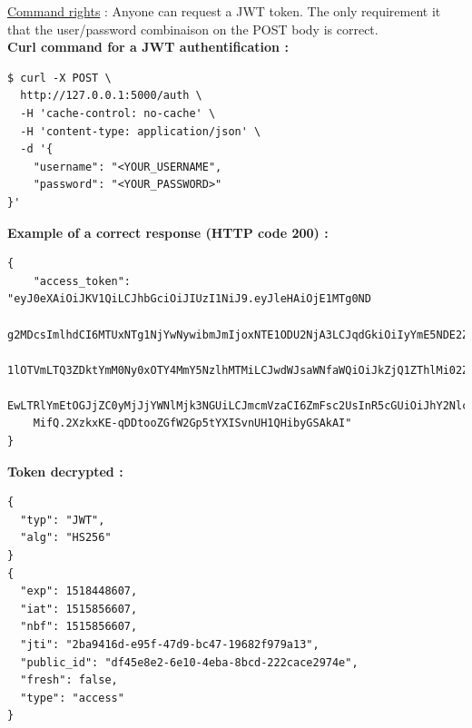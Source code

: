 \underline{Command rights} : Anyone can request a JWT token. The only requirement it that the user/password combinaison on the POST body is correct.\\

\textbf{Curl command for a JWT authentification :}

\begin{tcolorbox}[top=-3mm, bottom=-3mm, left=0mm, right=0mm, enhanced, breakable, colback=LightGray, colframe=DarkGray, colbacktitle=DarkGray]
\begin{verbatim}
$ curl -X POST \
  http://127.0.0.1:5000/auth \
  -H 'cache-control: no-cache' \
  -H 'content-type: application/json' \
  -d '{
    "username": "<YOUR_USERNAME",
    "password": "<YOUR_PASSWORD>"
}'
\end{verbatim}
\end{tcolorbox}

\textbf{Example of a correct response (HTTP code 200) :}

\begin{tcolorbox}[top=-3mm, bottom=-3mm, left=0mm, right=0mm, enhanced, breakable, colback=LightGray, colframe=DarkGray, colbacktitle=DarkGray]
\begin{verbatim}
{
    "access_token": "eyJ0eXAiOiJKV1QiLCJhbGciOiJIUzI1NiJ9.eyJleHAiOjE1MTg0ND
    g2MDcsImlhdCI6MTUxNTg1NjYwNywibmJmIjoxNTE1ODU2NjA3LCJqdGkiOiIyYmE5NDE2ZC
    1lOTVmLTQ3ZDktYmM0Ny0xOTY4MmY5NzlhMTMiLCJwdWJsaWNfaWQiOiJkZjQ1ZThlMi02ZT
    EwLTRlYmEtOGJjZC0yMjJjYWNlMjk3NGUiLCJmcmVzaCI6ZmFsc2UsInR5cGUiOiJhY2Nlc3
    MifQ.2XzkxKE-qDDtooZGfW2Gp5tYXISvnUH1QHibyGSAkAI"
}
\end{verbatim}
\end{tcolorbox}

\textbf{Token decrypted :} 

\begin{tcolorbox}[top=-3mm, bottom=-3mm, left=0mm, right=0mm, enhanced, breakable, colback=LightGray, colframe=DarkGray, colbacktitle=DarkGray]
\begin{verbatim}
{
  "typ": "JWT",
  "alg": "HS256"
}
{
  "exp": 1518448607,
  "iat": 1515856607,
  "nbf": 1515856607,
  "jti": "2ba9416d-e95f-47d9-bc47-19682f979a13",
  "public_id": "df45e8e2-6e10-4eba-8bcd-222cace2974e",
  "fresh": false,
  "type": "access"
}
\end{verbatim}
\end{tcolorbox}

